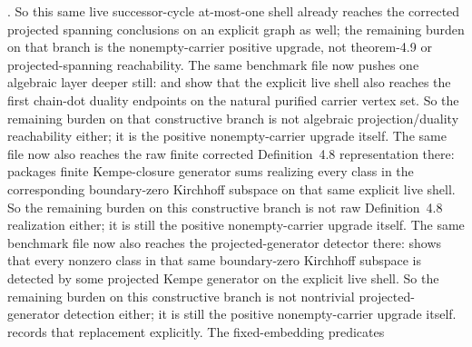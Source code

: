 \documentclass[11pt]{article}
\begin{document}
.
So this same live successor-cycle at-most-one shell already reaches the
corrected projected spanning conclusions on an explicit graph as well; the
remaining burden on that branch is the nonempty-carrier positive upgrade, not
theorem-4.9 or projected-spanning reachability.
The same benchmark file now pushes one algebraic layer deeper still:
and
show that the explicit live shell also reaches the first chain-dot duality
endpoints on the natural purified carrier vertex set.  So the remaining burden
on that constructive branch is not algebraic projection/duality reachability
either; it is the positive nonempty-carrier upgrade itself.
The same file now also reaches the raw finite corrected Definition~4.8
representation there:
packages finite Kempe-closure generator sums realizing every class in the
corresponding boundary-zero Kirchhoff subspace on that same explicit live shell.
So the remaining burden on this constructive branch is not raw
Definition~4.8 realization either; it is still the positive nonempty-carrier
upgrade itself.  The same benchmark file now also reaches the
projected-generator detector there:
shows that every nonzero class in that same boundary-zero Kirchhoff subspace is
detected by some projected Kempe generator on the explicit live shell.  So the
remaining burden on this constructive branch is not nontrivial
projected-generator detection either; it is still the positive
nonempty-carrier upgrade itself.
 records that
replacement explicitly.  The fixed-embedding predicates
\end{document}
